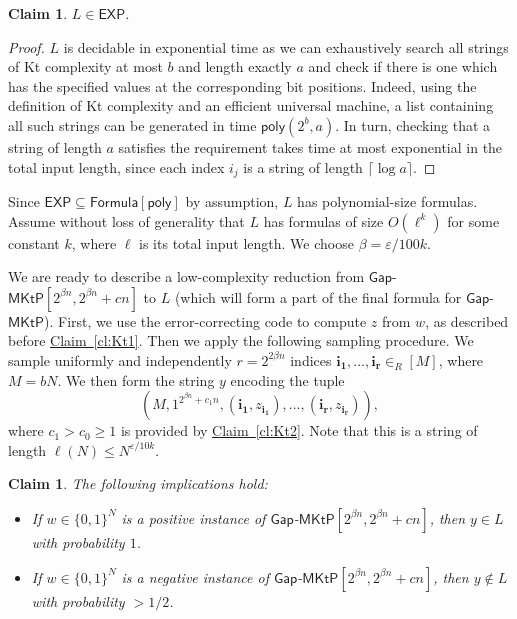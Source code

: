 \documentclass[11pt]{article}
\numberwithin{equation}{section}
\newtheorem{claim}[theorem]{Claim}
\theoremstyle{definition}
\theoremstyle{plain}
\newcommand{\expref}[2]{\hyperref[#2]{#1~\ref{#2}}}
\newcommand{\gapmktp}{\mathsf{Gap}$-$\mathsf{MKtP}}
\begin{document}
\begin{claim}\label{cl:L_in_EXP}
$L \in \mathsf{EXP}$.
\end{claim}

\begin{proof}
$L$ is decidable in exponential time as we can exhaustively search all strings of Kt complexity at most $b$ and length exactly $a$ and check if there is one which has the specified values at the corresponding bit positions. Indeed, using the definition of Kt complexity and an efficient universal machine, a list containing all such strings can be generated in time $\mathsf{poly}(2^b, a)$. 
In turn, checking that a string of length $a$ satisfies the requirement takes time at most exponential in the total input length, since each index $i_j$ is a string of length $\lceil \log a \rceil$.
\end{proof}

Since $\mathsf{EXP} \subseteq \mathsf{Formula}[\mathsf{poly}]$ by assumption, $L$ has polynomial-size formulas. Assume without loss of generality that $L$ has formulas of size $O(\ell^k)$ for some constant $k$, where $\ell$ is its total input length. We choose $\beta = \varepsilon/100k$.

We are ready to describe a low-complexity reduction from $\gapmktp[2^{\beta n}, 2^{\beta n} + cn]$ to $L$ (which will form a part of the final formula for $\gapmktp$). First, we use the error-correcting code to compute $z$ from $w$, as described before \expref{Claim}{cl:Kt1}. Then we apply the following sampling procedure. We sample uniformly and independently $r = 2^{2\beta n}$ indices ${\bm{i_1}}, \ldots , {\bm{i_r}} \in_R [M]$, where $M = bN$. We then form the string $y$ encoding the tuple 
$$(M, 1^{2^{\beta n} + c_1n}, ({\bm{i_1}}, z_{{\bm{i_1}}}), \ldots, ({\bm{i_r}}, z_{{\bm{i_r}}})),$$ 
where $c_1 > c_0 \geq 1$ is provided by \expref{Claim}{cl:Kt2}. Note that this is a string of length $\ell(N) \leq N^{\varepsilon/10k}$.

\begin{claim}\label{cl:correctness_reduction}
The following implications hold:
\vspace{0.2cm}
\begin{itemize}
\item[(\emph{a})] If $w \in \{0,1\}^N$ is a positive instance of $\gapmktp[2^{\beta n}, 2^{\beta n} + cn]$, then $y \in L$ with probability $1$.
\item[(\emph{b})] If $w \in \{0,1\}^N$ is a negative instance of $\gapmktp[2^{\beta n}, 2^{\beta n} + cn]$, then $y \notin L$ with probability $> 1/2$.
\end{itemize}
\end{claim}
\end{document}
